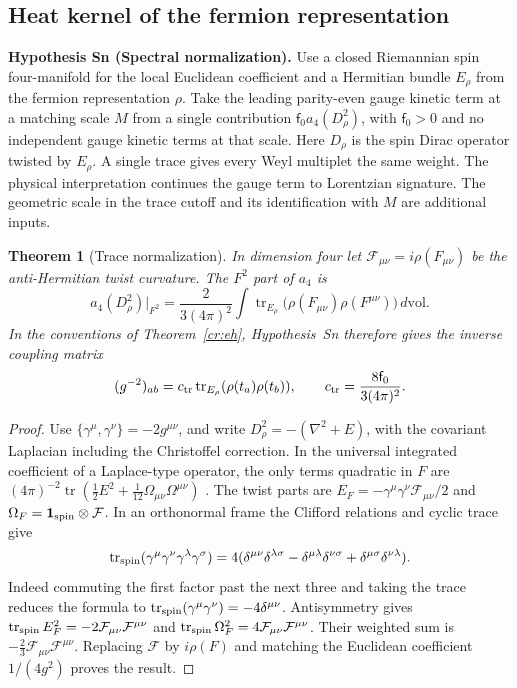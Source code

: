 \documentclass[aps,pra,onecolumn,superscriptaddress,nofootinbib,10pt]{revtex4-2}
\newtheorem{theorem}{Theorem}
\theoremstyle{definition}
\theoremstyle{remark}
\begin{document}
\subsection{Heat kernel of the fermion representation}

\smallskip\noindent\textbf{Hypothesis Sn (Spectral normalization).}\label{hyp:Sn}  Use a closed Riemannian spin four-manifold for the local Euclidean
coefficient and a Hermitian bundle $E_\rho$ from the fermion
representation $\rho$. Take the leading parity-even gauge kinetic
term at a matching scale $M$ from a single contribution
$\mathsf f_0a_4(D_\rho^2)$, with $\mathsf f_0>0$ and no independent gauge kinetic
terms at that scale. Here $D_\rho$ is the spin Dirac operator twisted
by $E_\rho$. A single trace gives every Weyl multiplet the same weight.
The physical interpretation continues the gauge term to Lorentzian
signature. The geometric scale in the trace cutoff and its
identification with $M$ are additional inputs.


\begin{theorem}[Trace normalization]\label{cr:heat}
In dimension four let $\mathcal F_{\mu\nu}=i\rho(F_{\mu\nu})$
be the anti-Hermitian twist curvature. The $F^2$ part of $a_4$ is
\begin{equation}\label{cr:a4}
 a_4(D_\rho^2)\big|_{F^2}
   =\frac{2}{3(4\pi)^2}\int
            \operatorname{tr}_{E_\rho}
               \big(\rho(F_{\mu\nu})\rho(F^{\mu\nu})\big)\,d\mathrm{vol}.
\end{equation}
In the conventions of Theorem~\ref{cr:eh}, Hypothesis~Sn
therefore gives the inverse coupling matrix
\[
 (g^{-2})_{ab}
   =c_{\rm tr}\operatorname{tr}_{E_\rho}(\rho(t_a)\rho(t_b)),
 \qquad c_{\rm tr}=\frac{8\mathsf f_0}{3(4\pi)^2}.
\]
\end{theorem}
\begin{proof}
Use $\{\gamma^\mu,\gamma^\nu\}=-2g^{\mu\nu}$, and write
$D_\rho^2=-(\nabla^2+E)$, with the covariant Laplacian including
the Christoffel correction. In the universal integrated coefficient
of a Laplace-type operator, the only terms quadratic in $F$ are
$(4\pi)^{-2}\operatorname{tr}(\tfrac12 E^2+
\tfrac1{12}\Omega_{\mu\nu}\Omega^{\mu\nu})$
\cite[Eq.~(4.28)]{cr:vassilevich}. The twist parts are
$E_F=-\gamma^\mu\gamma^\nu\mathcal F_{\mu\nu}/2$ and
$\Omega_F=\mathbf 1_{\rm spin}\otimes\mathcal F$. In an orthonormal
frame the Clifford relations and cyclic trace give
\[
 \operatorname{tr}_{\rm spin}
   (\gamma^\mu\gamma^\nu\gamma^\lambda\gamma^\sigma)
 =4(\delta^{\mu\nu}\delta^{\lambda\sigma}
 -\delta^{\mu\lambda}\delta^{\nu\sigma}
 +\delta^{\mu\sigma}\delta^{\nu\lambda}).
\]
Indeed commuting the first factor past the next three and taking
the trace reduces the formula to
$\operatorname{tr}_{\rm spin}(\gamma^\mu\gamma^\nu)=-4\delta^{\mu\nu}$.
Antisymmetry gives
$\operatorname{tr}_{\rm spin}E_F^2=-2\mathcal F_{\mu\nu}\mathcal
F^{\mu\nu}$ and $\operatorname{tr}_{\rm spin}\Omega_F^2=4\mathcal
F_{\mu\nu}\mathcal F^{\mu\nu}$. Their weighted sum is
$-\tfrac23\mathcal F_{\mu\nu}\mathcal F^{\mu\nu}$. Replacing
$\mathcal F$ by $i\rho(F)$ and matching the Euclidean coefficient
$1/(4g^2)$ proves the result.
\end{proof}
\end{document}
